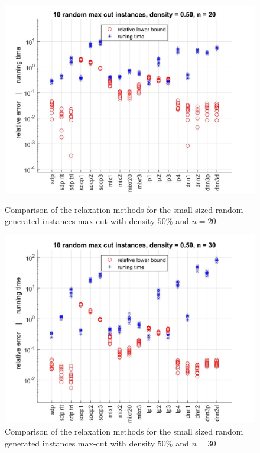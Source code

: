 \documentclass[12pt]{book}
\theoremstyle{definition}
\begin{document}
\begin{figure}
\centering
\includegraphics[scale=0.27]{img/comp0_d50_n20.jpg}
\caption[Comparison of relaxations - small, dense instances of max-cut 1]{Comparison of the relaxation methods for the small sized random generated instances max-cut with density $50\%$ and $n=20$.}
\label{comp0_d50_n20}

\includegraphics[scale = 0.27]{img/comp0_d50_n30.jpg}
\caption[Comparison of relaxations - small, dense instances of max-cut 2]{Comparison of the relaxation methods for the small sized random generated instances max-cut with density $50\%$ and $n=30$.}
\label{comp0_d50_n30}
\end{figure}
\end{document}
